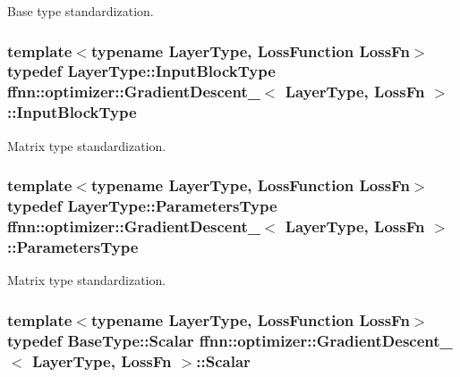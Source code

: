 Base type standardization. 

\hypertarget{classffnn_1_1optimizer_1_1_gradient_descent___a4870280152e25bf9a7622d52fa889b06}{
\subsubsection[{Input\-Block\-Type}]{\setlength{\rightskip}{0pt plus 5cm}template$<$typename Layer\-Type, Loss\-Function Loss\-Fn$>$ typedef Layer\-Type\-::\-Input\-Block\-Type {\bf ffnn\-::optimizer\-::\-Gradient\-Descent\-\_\-}$<$ Layer\-Type, Loss\-Fn $>$\-::{\bf Input\-Block\-Type}}}\label{classffnn_1_1optimizer_1_1_gradient_descent___a4870280152e25bf9a7622d52fa889b06}


Matrix type standardization. 

\hypertarget{classffnn_1_1optimizer_1_1_gradient_descent___ae5ad0804c042e40a0a0ac64ae34fdc85}{
\subsubsection[{Parameters\-Type}]{\setlength{\rightskip}{0pt plus 5cm}template$<$typename Layer\-Type, Loss\-Function Loss\-Fn$>$ typedef Layer\-Type\-::\-Parameters\-Type {\bf ffnn\-::optimizer\-::\-Gradient\-Descent\-\_\-}$<$ Layer\-Type, Loss\-Fn $>$\-::{\bf Parameters\-Type}}}\label{classffnn_1_1optimizer_1_1_gradient_descent___ae5ad0804c042e40a0a0ac64ae34fdc85}


Matrix type standardization. 

\hypertarget{classffnn_1_1optimizer_1_1_gradient_descent___a9ea42179033176eb7686e00769034c8a}{
\subsubsection[{Scalar}]{\setlength{\rightskip}{0pt plus 5cm}template$<$typename Layer\-Type, Loss\-Function Loss\-Fn$>$ typedef {\bf Base\-Type\-::\-Scalar} {\bf ffnn\-::optimizer\-::\-Gradient\-Descent\-\_\-}$<$ Layer\-Type, Loss\-Fn $>$\-::{\bf Scalar}}}\label{classffnn_1_1optimizer_1_1_gradient_descent___a9ea42179033176eb7686e00769034c8a}


